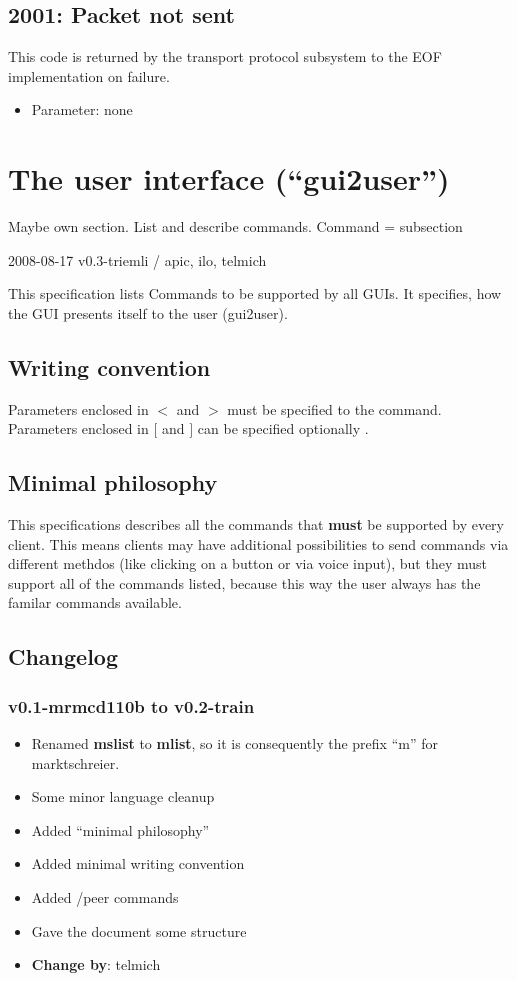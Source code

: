\documentclass[12pt,a4paper]{book}
\begin{document}
\subsection{2001: Packet not sent}
This code is returned by the transport protocol subsystem to the
EOF implementation on failure.
\begin{itemize}
\item Parameter: none
\end{itemize}
\section{The user interface ("`gui2user"')}
Maybe own section.
List and describe commands.
Command = subsection

2008-08-17 v0.3-triemli / apic, ilo, telmich

This specification lists Commands to be supported by all GUIs. It
specifies, how the GUI presents itself to the user (gui2user).

\subsection{Writing convention}
Parameters enclosed in $<$ and $>$ must be specified to the command.
Parameters enclosed in $[$ and $]$ can be specified optionally .

\subsection{Minimal philosophy}
This specifications describes all the commands that \textbf{must} be
supported by every client. This means clients may have additional possibilities
to send commands via different methdos (like clicking on a button or via
voice input), but they must support all of the commands listed, because this
way the user always has the familar commands available.

\subsection{Changelog}
\subsubsection{v0.1-mrmcd110b to v0.2-train}
   \begin{itemize}
      \item Renamed \textbf{mslist} to \textbf{mlist}, so it is consequently the prefix
      "`m"' for marktschreier.
      \item Some minor language cleanup 
      \item Added "`minimal philosophy"'
      \item Added minimal writing convention
      \item Added /peer commands
      \item Gave the document some structure
      \item \textbf{Change by}: telmich
   \end{itemize}
\end{document}
